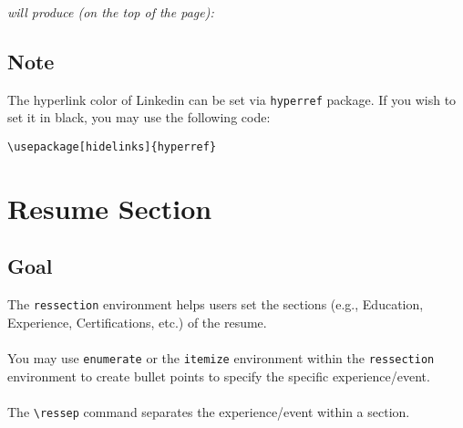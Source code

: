 \documentclass[a4paper,10pt]{article}
\begin{document}
{\it will produce (on the top of the page):}

\vspace{1cm}

\begin{tcolorbox}[standard jigsaw,opacityback=0.1,colback=gray,boxrule=0.5pt]
\end{tcolorbox}

\vspace{1cm}

\subsection{Note}
The hyperlink color of Linkedin can be set via {\tt hyperref} package. If you wish to set it in black, you may use the following code:

\begin{lstlisting}
\usepackage[hidelinks]{hyperref}
\end{lstlisting}

\newpage

\section{Resume Section}

\subsection{Goal}
The \verb+ressection+ environment helps users set the sections (e.g., Education, Experience, Certifications, etc.) of the resume.\\
~\\
You may use {\tt enumerate} or the {\tt itemize} environment within the {\tt ressection} environment to create bullet points to specify the specific experience/event.\\
~\\
The \verb+\ressep+ command separates the experience/event within a section.

\newpage
\end{document}
